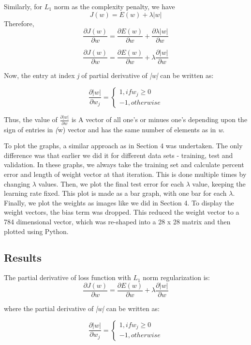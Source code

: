 \documentclass{article}
\begin{document}
Similarly, for $L_{1}$ norm as the complexity penalty, we have 
$$J(w) = E(w) + \lambda |w|$$
Therefore, 
$$\frac{\partial J(w)}{\partial w} = \frac{\partial E(w)}{\partial w} + \frac{\partial \lambda |w|}{\partial w}$$

$$\frac{\partial J(w)}{\partial w} = \frac{\partial E(w)}{\partial w} + \lambda \frac{\partial |w|}{\partial w}$$

Now, the entry at index \emph{j} of partial derivative of \emph{|w|} can be written as: 

\[
	\frac{\partial |w|}{\partial w_j} = \left\{
                \begin{array}{ll}
                  1, if w_j \geq 0\\
                  -1, otherwise
                \end{array}
              \right.
\]

Thus, the value of $\frac{\partial |w|}{\partial w}$ is A vector of all one's or minues one's depending upon the sign of entries in \emph(w) vector and has the same number of elements as in \emph{w}.

To plot the graphs, a similar approach as in Section 4 was undertaken. The only difference was that earlier we did it for different data sets - training, test and validation. In these graphs, we always take the training set and calculate percent error and length of weight vector at that iteration. This is done multiple times by changing $\lambda$ values. Then, we plot the final test error for each $\lambda$ value, keeping the learning rate fixed. This plot is made as a bar graph, with one bar for each $\lambda$. Finally, we plot the weights as images like we did in Section 4. To display the weight vectors, the bias term was dropped. This reduced the weight vector to a 784 dimensional vector, which was re-shaped into a 28 x 28 matrix and then plotted using Python.

\subsection{Results}
The partial derivative of loss function with $L_{1}$ norm regularization is:
$$\frac{\partial J(w)}{\partial w} = \frac{\partial E(w)}{\partial w} + \lambda \frac{\partial |w|}{\partial w}$$

where the partial derivative of \emph{|w|} can be written as: 

\[
	\frac{\partial |w|}{\partial w_j} = \left\{
                \begin{array}{ll}
                  1, if w_j \geq 0\\
                  -1, otherwise
                \end{array}
              \right.
\]
\end{document}
